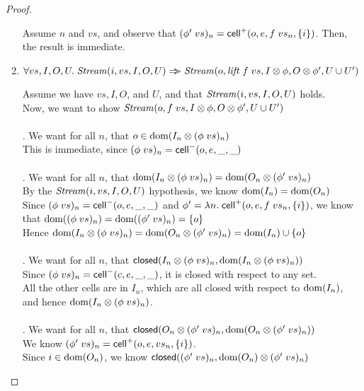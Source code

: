 \begin{proof}
\begin{enumerate}
  Assume $n$ and $vs$, and observe that $(\phi'\;vs)_n = \mathsf{cell}^{+}({o}, {e}, {f\;vs_n}, {\{{i}\}})$. Then,
  the result is immediate. 

\item $\forall vs, I, O, U.\; \mathit{Stream}(i, vs, I, O, U) \Rightarrow\!\!\!> \mathit{Stream}(o, \mathit{lift}\;f\;vs, I \otimes \phi, O \otimes \phi', U \cup U')$
  \begin{tabbedproof}
  \oo Assume we have $vs, I, O$, and $U$, and that $\mathit{Stream}(i, vs, I, O, U)$ holds. \\
  \oo Now, we want to show $\mathit{Stream}(o, f\;vs, I \otimes \phi, O \otimes \phi', U \cup U')$ \\
  \\ . We want for all $n$, that $o \in \mbox{dom}({I_n \otimes (\phi\;vs)_n})$ \\
  \ooo This is immediate, since $(\phi\;vs)_n = \mathsf{cell}^{-}({o}, {e}, {\_}, {\_})$ \\
  \\ . We want for all $n$, that $\mbox{dom}({I_n \otimes (\phi\;vs)_n}) = \mbox{dom}({O_n \otimes (\phi'\;vs)_n})$ \\
  \ooo By the $\mathit{Stream}(i, vs, I, O, U)$ hypothesis, we know $\mbox{dom}({I_n}) = \mbox{dom}({O_n})$ \\
  \ooo Since $(\phi\;vs)_n = \mathsf{cell}^{-}({o}, {e}, {\_}, {\_})$ and $\phi' = \lambda n.\;\mathsf{cell}^{+}({o}, {e}, {f\;vs_n}, {\{{i}\}})$, we know \\
  \oox that $\mbox{dom}({(\phi\;vs)_n}) = \mbox{dom}({(\phi'\;vs)_n}) = \{{o}\}$ \\
  \ooo Hence $\mbox{dom}({I_n \otimes (\phi\;vs)_n}) = \mbox{dom}({O_n \otimes (\phi'\;vs)_n}) = \mbox{dom}({I_n}) \cup \{{o}\}$  \\
  \\ . We want for all $n$, that $\mathsf{closed}({I_n \otimes (\phi\;vs)_n}, {\mbox{dom}({I_n \otimes (\phi\;vs)_n})})$\\
  \ooo Since $(\phi\;vs)_n = \mathsf{cell}^{-}({c}, {e}, {\_}, {\_})$, it is closed with respect to any set. \\
  \ooo All the other cells are in $I_n$, which are all closed with respect to $\mbox{dom}({I_n})$, \\
  \oox and hence $\mbox{dom}({I_n \otimes (\phi\;vs)_n})$. \\
  \\ . We want for all $n$, that $\mathsf{closed}({O_n \otimes (\phi'\;vs)_n}, {\mbox{dom}({O_n \otimes (\phi'\;vs)_n})})$\\
  \ooo We know $(\phi'\;vs)_n = \mathsf{cell}^{+}({o}, {e}, {vs_n}, {\{{i}\}})$. \\
  \ooo Since $i \in \mbox{dom}({O_n})$, we know $\mathsf{closed}({(\phi'\;vs)_n}, {\mbox{dom}({O_n}) \otimes (\phi'\;vs)_n})$ \\

\end{tabbedproof}
\end{enumerate}
\end{proof}
